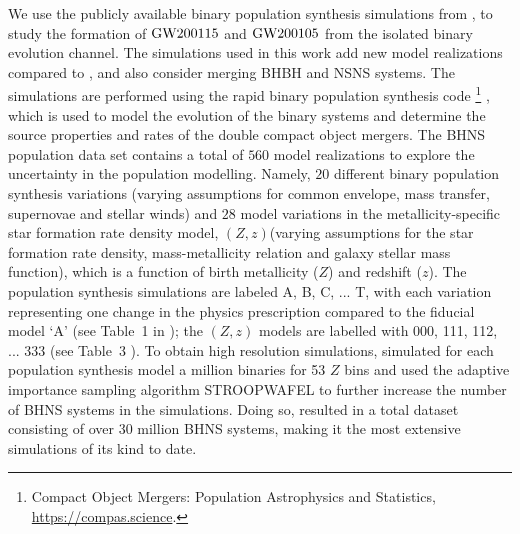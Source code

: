 \documentclass{aastex63}
\newcommand{\Zi}{\ensuremath{Z}\xspace}
\newcommand{\SFRD}{\text{SFRD}\ensuremath{(Z,z)}\xspace}
\newcommand{\Nmodels}{\ensuremath{560}\xspace}
\newcommand{\NmodelsBPS}{\ensuremath{20}\xspace}
\newcommand{\NmodelsMSSFR}{\ensuremath{28}\xspace}
\newcommand{\gwone}{\ensuremath{\rm{GW200115}}\xspace}
\newcommand{\gwzero}{\ensuremath{\rm{GW200105}}\xspace}
\begin{document}
We use the publicly available binary population synthesis simulations from \citet[][presented in  \citealt{BroekgaardenDCOmergers:2021}]{ZenodoDCOBHNS:2021}, to study the formation of \gwone and \gwzero from the isolated binary evolution channel.  The simulations used in this work 
add new model realizations compared to \citet{Broekgaarden:2021}, and also consider merging \ac{BHBH} and \ac{NSNS} systems. The simulations are performed using the rapid binary population synthesis code {}\footnote{Compact Object Mergers: Population Astrophysics and Statistics, \url{https://compas.science}.}  \citep[][]{Stevenson:2017, Barrett:2017, VignaGomez:2018, Broekgaarden:2019, Neijssel:2019}, which is used to model the evolution of the binary systems and determine the source properties and rates of the double compact object mergers. The \ac{BHNS} population data set contains a total of \Nmodels  model realizations to explore the uncertainty in the population modelling. 
Namely, \NmodelsBPS different binary population synthesis variations (varying assumptions for common envelope, mass transfer, supernovae and stellar winds) and \NmodelsMSSFR model variations in the metallicity-specific star formation rate density model, \SFRD (varying assumptions for the star formation rate density, mass-metallicity relation and galaxy stellar mass function), which is a function of birth metallicity ($Z$) and redshift ($z$). The population synthesis simulations are labeled A, B, C, ... T, with each variation representing one change in the physics prescription compared to the fiducial model `A' (see Table~1 in \citealt{BroekgaardenDCOmergers:2021}); the \SFRD models are labelled with 000, 111, 112, ... 333 (see Table~3 \citealt[][]{Broekgaarden:2021}).  To obtain high resolution simulations, \citet{BroekgaardenDCOmergers:2021} simulated for each population synthesis model a million binaries for 53 $\Zi$ bins and used the adaptive importance sampling algorithm STROOPWAFEL \citep{Broekgaarden:2019} to further increase the number of \ac{BHNS} systems in the simulations. Doing so, resulted in a total dataset consisting of over 30 million \ac{BHNS} systems, making it the most extensive simulations of its kind to date. 
\end{document}

